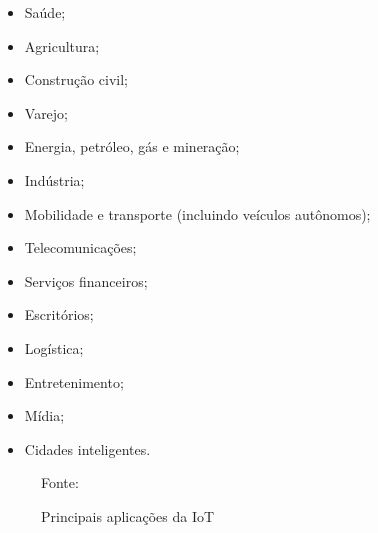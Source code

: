 \documentclass[pdftex, brazil, 12pt, twoside]{article}
\begin{document}
\begin{itemize}[noitemsep]
\item Saúde;
\item Agricultura;
\item Construção civil;
\item Varejo;
\item Energia, petróleo, gás e mineração;
\item Indústria;
\item Mobilidade e transporte (incluindo veículos autônomos);
\item Telecomunicações;
\item Serviços financeiros;
\item Escritórios;
\item Logística;
\item Entretenimento;  
\item Mídia;
\item Cidades inteligentes.
\end{itemize}

\begin{figure}[!h]
  \begin{center}
    \caption{Principais aplicações da IoT}
    \label{fig:aplicacoes-iot-1}
    
    \footnotesize{Fonte:~\citet[][p.\ 5]{OliverWymanIoT2015}}
  \end{center}
\end{figure}
\end{document}
